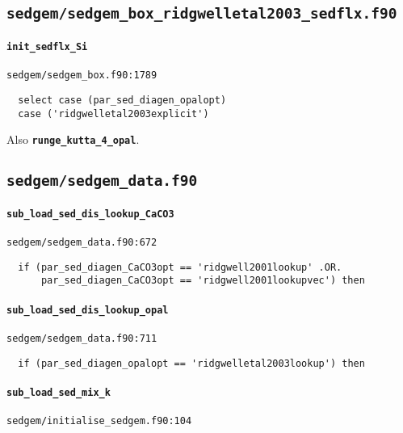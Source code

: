 \documentclass[a4paper,10pt,article]{memoir}
\begin{document}
\subsection*{\texttt{sedgem/sedgem\_box\_ridgwelletal2003\_sedflx.f90}}

\paragraph{\texttt{init\_sedflx\_Si}}

\texttt{sedgem/sedgem\_box.f90:1789}

\begin{verbatim}
  select case (par_sed_diagen_opalopt)
  case ('ridgwelletal2003explicit')
\end{verbatim}

Also \textbf{\texttt{runge\_kutta\_4\_opal}}.


\subsection*{\texttt{sedgem/sedgem\_data.f90}}

\paragraph{\texttt{sub\_load\_sed\_dis\_lookup\_CaCO3}}

\texttt{sedgem/sedgem\_data.f90:672}

\begin{verbatim}
  if (par_sed_diagen_CaCO3opt == 'ridgwell2001lookup' .OR.
      par_sed_diagen_CaCO3opt == 'ridgwell2001lookupvec') then
\end{verbatim}

\paragraph{\texttt{sub\_load\_sed\_dis\_lookup\_opal}}

\texttt{sedgem/sedgem\_data.f90:711}

\begin{verbatim}
  if (par_sed_diagen_opalopt == 'ridgwelletal2003lookup') then
\end{verbatim}

\paragraph{\texttt{sub\_load\_sed\_mix\_k}}

\texttt{sedgem/initialise\_sedgem.f90:104}
\end{document}
